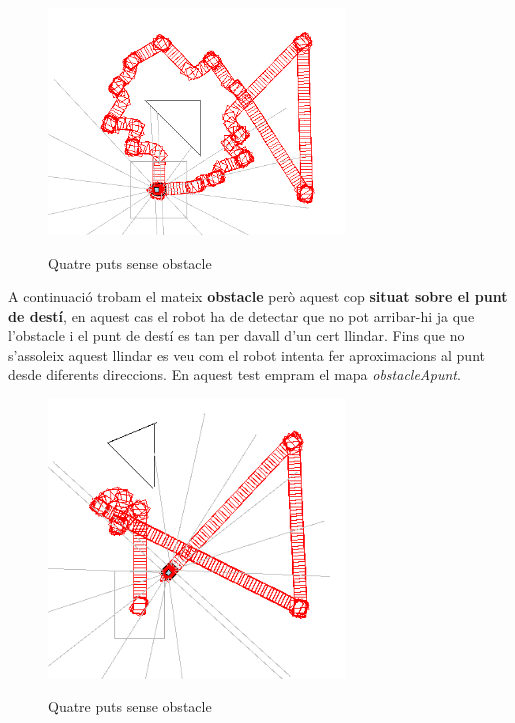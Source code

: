 \begin{figure}[H]
\begin{center}\label{4puntsObs}
 \includegraphics[width=0.7\textwidth]{diagrames/figures/4puntsObs.png}
\end{center}
  \caption{Quatre puts sense obstacle}
\end{figure}


A continuació trobam el mateix \textbf{obstacle} però aquest cop \textbf{situat sobre el punt de destí}, en aquest cas
el robot ha de detectar que no pot arribar-hi ja que l'obstacle i el punt de destí es tan per davall d'un cert
llindar. Fins que no s'assoleix aquest llindar es veu com el robot intenta fer aproximacions al punt desde
diferents direccions. En aquest test empram el mapa \emph{obstacleApunt}.

\begin{figure}[H]
\begin{center}\label{obsapunt}
 \includegraphics[width=0.7\textwidth]{diagrames/figures/obsapunt.png}
\end{center}
  \caption{Quatre puts sense obstacle}
\end{figure}


